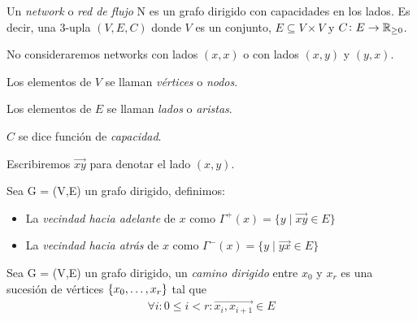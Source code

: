 \begin{definition}
  Un \emph{network} o \emph{red de flujo}  N es un grafo dirigido con capacidades
  en los lados. Es decir, una $3$-upla $(V, E, C)$ donde $V$ es un conjunto,
  $E \subseteq V \times V$ y $C \colon E \to \mathbb{R}_{\ge 0}$.

  No consideraremos networks con lados $(x,x)$ o con lados $(x,y)$ y $(y,x)$.
\end{definition}

\begin{notation}
  Los elementos de $V$ se llaman \emph{vértices} o \emph{nodos}.

  Los elementos de $E$ se llaman \emph{lados} o \emph{aristas}.

  $C$ se dice función de \emph{capacidad}.

  Escribiremos $\overrightarrow{xy}$ para denotar el lado $(x,y)$.
\end{notation}

\begin{definition}
  Sea G = (V,E) un grafo dirigido, definimos:
  \begin{itemize}
  \item La \emph{vecindad hacia adelante} de $x$ como
    $\Gamma^{+}(x) = \{y\mid \overrightarrow{xy} \in E\}$
  \item La \emph{vecindad hacia atrás} de $x$ como
    $\Gamma^{-}(x) = \{y\mid \overrightarrow{yx} \in E\}$
  \end{itemize}
\end{definition}

\begin{definition}
Sea G = (V,E) un grafo dirigido, un \emph{camino dirigido} entre $x_0$ y $x_r$ es una sucesión de vértices $\{x_0,\mathellipsis, x_r\}$ tal que
\begin{align}
    \forall i: 0\le i < r : \overrightarrow{x_i,x_{i+1}} \in E
\end{align}
\end{definition}

